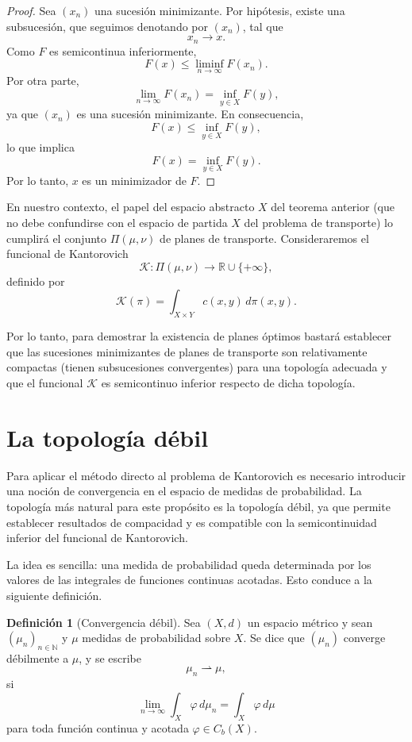 \documentclass[12pt, a4paper]{amsbook}
\theoremstyle{remark}
\theoremstyle{definition}
\newtheorem{defi}[teo]{Definición}
\numberwithin{section}{chapter}
\numberwithin{subsection}{section}
\numberwithin{equation}{section}
\numberwithin{figure}{chapter}
\begin{document}
\begin{proof}
Sea \((x_n)\) una sucesión minimizante. Por hipótesis, existe una subsucesión, que seguimos denotando por \((x_n)\), tal que
\[
x_n\longrightarrow x.
\]
Como \(F\) es semicontinua inferiormente,
\[
F(x)\le\liminf_{n\to\infty}F(x_n).
\]
Por otra parte,
\[
\lim_{n\to\infty}F(x_n)=\inf_{y\in X}F(y),
\]
ya que \((x_n)\) es una sucesión minimizante. En consecuencia,
\[
F(x)\le\inf_{y\in X}F(y),
\]
lo que implica
\[
F(x)=\inf_{y\in X}F(y).
\]
Por lo tanto, \(x\) es un minimizador de \(F\).
\end{proof}

En nuestro contexto, el papel del espacio abstracto \(X\) del teorema anterior (que no debe confundirse con el espacio de partida \(X\) del problema de transporte) lo cumplirá el conjunto \(\Pi(\mu,\nu)\) de planes de transporte. Consideraremos el funcional de Kantorovich
\[
\mathcal K\colon\Pi(\mu,\nu)\to\mathbb R\cup\{+\infty\},
\]
definido por
\begin{equation}\label{Funcional.Kantorovich}
\mathcal K(\pi)=
\int_{X\times Y} c(x,y)\,d\pi(x,y).
\end{equation}

Por lo tanto, para demostrar la existencia de planes óptimos bastará establecer que las sucesiones minimizantes de planes de transporte son relativamente compactas (tienen subsucesiones convergentes) para una topología adecuada y que el funcional \(\mathcal K\) es semicontinuo inferior respecto de dicha topología.


\section{La topología débil}

Para aplicar el método directo al problema de Kantorovich es necesario introducir una noción de convergencia en el espacio de medidas de probabilidad. La topología más natural para este propósito es la topología débil, ya que permite establecer resultados de compacidad y es compatible con la semicontinuidad inferior del funcional de Kantorovich.

La idea es sencilla: una medida de probabilidad queda determinada por los valores de las integrales de funciones continuas acotadas. Esto conduce a la siguiente definición.

\begin{defi}[Convergencia débil]
Sea \((X,d)\) un espacio métrico y sean \((\mu_n)_{n\in\mathbb N}\) y \(\mu\) medidas de probabilidad sobre \(X\). Se dice que \((\mu_n)\) converge débilmente a \(\mu\), y se escribe
\[
\mu_n\rightharpoonup\mu,
\]
si
\[
\lim_{n\to\infty}\int_X\varphi\,d\mu_n
=
\int_X\varphi\,d\mu
\]
para toda función continua y acotada
\(
\varphi\in C_b(X).
\)
\end{defi}
\end{document}
